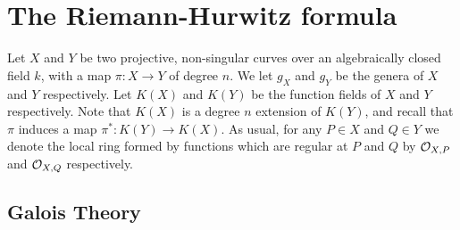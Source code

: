 \chapter{The Riemann-Hurwitz formula} \label{Chapter:hurwitzformula}


Let $X$ and $Y$ be two projective, non-singular curves over an algebraically closed field $k$, with a map $\pi \colon X \rightarrow Y$ of degree $n$.
We let $g_X$ and $g_Y$ be the genera of $X$ and $Y$ respectively.
Let $K(X)$ and $K(Y)$ be the function fields of $X$ and $Y$ respectively.
Note that $K(X)$ is a degree $n$ extension of $K(Y)$, and recall that $\pi$ induces a map $\pi^*\colon K(Y) \rightarrow K(X)$.
As usual, for any $P \in X$ and $Q \in Y$ we denote the local ring formed by functions which are regular at $P$ and $Q$ by ${\cal O}_{X,P}$ and ${\cal O}_{X,Q}$ respectively.

\section{Galois Theory}\label{sectiongaloistheory}
    
